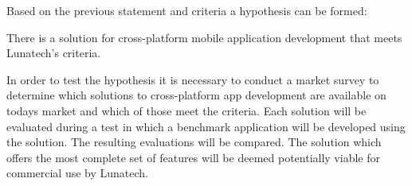 Based on the previous statement and criteria a hypothesis can be formed:
\begin{shadequote}
There is a solution for cross-platform mobile application development that meets Lunatech's criteria.%
\end{shadequote}


%


In order to test the hypothesis it is necessary to conduct a market survey to determine which solutions to cross-platform app development are available on todays market and which of those meet the criteria. Each solution will be evaluated during a test in which a benchmark application will be developed using the solution. The resulting evaluations will be compared. The solution which offers the most complete set of features will be deemed potentially viable for commercial use by Lunatech. 

